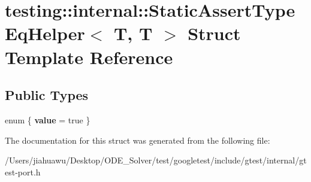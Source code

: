 \hypertarget{structtesting_1_1internal_1_1_static_assert_type_eq_helper_3_01_t_00_01_t_01_4}{}\section{testing\+:\+:internal\+:\+:Static\+Assert\+Type\+Eq\+Helper$<$ T, T $>$ Struct Template Reference}
\label{structtesting_1_1internal_1_1_static_assert_type_eq_helper_3_01_t_00_01_t_01_4}
\subsection*{Public Types}
\begin{DoxyCompactItemize}
\item 
\mbox{\label{structtesting_1_1internal_1_1_static_assert_type_eq_helper_3_01_t_00_01_t_01_4_a17df26ca6530ab723f563ade9017f9d6}} 
enum \{ {\bfseries value} = true
 \}
\end{DoxyCompactItemize}


The documentation for this struct was generated from the following file\+:\begin{DoxyCompactItemize}
\item 
/\+Users/jiahuawu/\+Desktop/\+O\+D\+E\+\_\+\+Solver/test/googletest/include/gtest/internal/gtest-\/port.\+h\end{DoxyCompactItemize}
